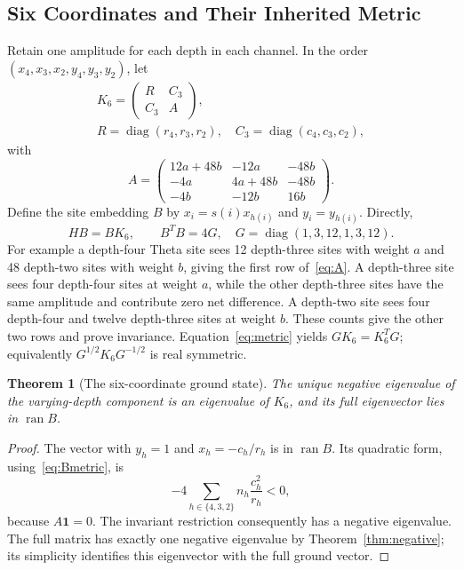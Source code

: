 \documentclass[journal,a4paper,10pt]{IEEEtran}
\newtheorem{theorem}{Theorem}
\theoremstyle{definition}\newtheorem{definition}[theorem]{Definition}
\theoremstyle{remark}\newtheorem{remark}[theorem]{Remark}
\newcommand{\one}{\mathbf 1}
\newcommand{\diag}{\operatorname{diag}}
\newcommand{\ran}{\operatorname{ran}}
\begin{document}
\subsection{Six Coordinates and Their Inherited Metric}
Retain one amplitude for each depth in each channel. In the order $(x_4,x_3,x_2,y_4,y_3,y_2)$, let
\begin{equation}\label{eq:K6}
\begin{gathered}
K_6=\begin{pmatrix}R&C_3\\C_3&A\end{pmatrix},\\
R=\diag(r_4,r_3,r_2),\quad C_3=\diag(c_4,c_3,c_2),
\end{gathered}
\end{equation}
with
\begin{equation}\label{eq:A}
A=\begin{pmatrix}
12a+48b&-12a&-48b\\
-4a&4a+48b&-48b\\
-4b&-12b&16b
\end{pmatrix}.
\end{equation}
Define the site embedding $B$ by $x_i=s(i)x_{h(i)}$ and $y_i=y_{h(i)}$. Directly,
\begin{equation}\label{eq:Bmetric}
HB=BK_6,\qquad B^TB=4G,
\quad G=\diag(1,3,12,1,3,12).
\end{equation}
For example a depth-four Theta site sees 12 depth-three sites with weight $a$ and 48 depth-two sites with weight $b$, giving the first row of~\eqref{eq:A}. A depth-three site sees four depth-four sites at weight $a$, while the other depth-three sites have the same amplitude and contribute zero net difference. A depth-two site sees four depth-four and twelve depth-three sites at weight $b$. These counts give the other two rows and prove invariance. Equation~\eqref{eq:metric} yields $GK_6=K_6^TG$; equivalently $G^{1/2}K_6G^{-1/2}$ is real symmetric.

\begin{theorem}[The six-coordinate ground state]\label{thm:six}
The unique negative eigenvalue of the varying-depth component is an eigenvalue of $K_6$, and its full eigenvector lies in $\ran B$.
\end{theorem}
\begin{proof}
The vector with $y_h=1$ and $x_h=-c_h/r_h$ is in $\ran B$. Its quadratic form, using~\eqref{eq:Bmetric}, is
\begin{equation}
-4\sum_{h\in\{4,3,2\}} n_h\frac{c_h^2}{r_h}<0,
\end{equation}
because $A\one=0$. The invariant restriction consequently has a negative eigenvalue. The full matrix has exactly one negative eigenvalue by Theorem~\ref{thm:negative}; its simplicity identifies this eigenvector with the full ground vector.
\end{proof}
\end{document}
